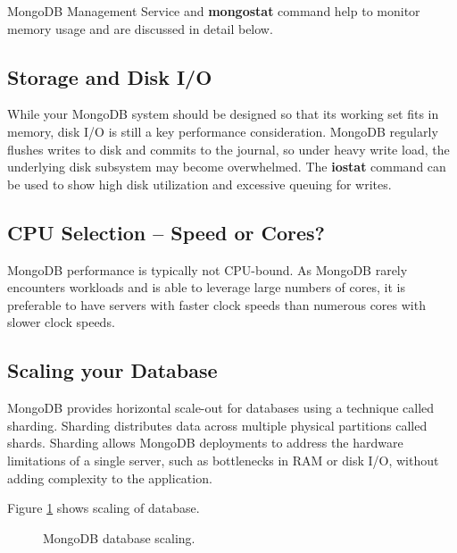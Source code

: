 \documentclass[9pt,twocolumn,twoside]{../../styles/osajnl}
\begin{document}
MongoDB Management Service and {\bfseries mongostat} command help to monitor memory usage and are discussed in detail below.

\subsection {Storage and Disk I/O}

While your MongoDB system should be designed so that its working set fits in memory, disk I/O is still a key performance consideration. MongoDB regularly flushes writes to disk and commits to the journal, so under heavy write load, the underlying disk subsystem may become overwhelmed. The {\bfseries iostat} command can be used to show high disk utilization and excessive queuing for writes.

\subsection {CPU Selection – Speed or Cores?}

MongoDB performance is typically not CPU-bound. As MongoDB rarely encounters workloads and is able to leverage large numbers of cores, it is preferable to have servers with faster clock speeds than numerous cores with slower clock speeds.

\subsection {Scaling your Database}

MongoDB provides horizontal scale-out for databases using a technique called sharding. Sharding distributes data across multiple physical partitions called shards. Sharding allows MongoDB deployments to address the hardware limitations of a single server, such as bottlenecks in RAM or disk I/O, without adding complexity to the application.

Figure \ref{fig:figure1} shows scaling of database.

\begin{figure}[htbp]
\centering
{}
\caption{MongoDB database scaling.}
\label{fig:figure1}
\end{figure}
\end{document}
